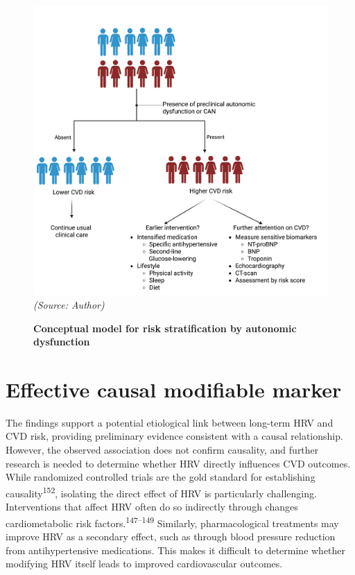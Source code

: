 \documentclass[
  a4paper,
  headsepline=true,
  open=left]{scrbook}
\begin{document}
\begin{figure}

{\centering 

\includegraphics{images/strafication_tree_of_CAN(1).png}\\
\emph{(Source: Author)}

}

\caption{\label{fig-rsp}\textbf{Conceptual model for risk stratification
by autonomic dysfunction}}

\end{figure}

\hypertarget{effective-causal-modifiable-marker}{%
\section{Effective causal modifiable
marker}\label{effective-causal-modifiable-marker}}

The findings support a potential etiological link between long-term HRV
and CVD risk, providing preliminary evidence consistent with a causal
relationship. However, the observed association does not confirm
causality, and further research is needed to determine whether HRV
directly influences CVD outcomes. While randomized controlled trials are
the gold standard for establishing causality\textsuperscript{152},
isolating the direct effect of HRV is particularly challenging.
Interventions that affect HRV often do so indirectly through changes
cardiometabolic risk factors.\textsuperscript{147--149} Similarly,
pharmacological treatments may improve HRV as a secondary effect, such
as through blood pressure reduction from antihypertensive medications.
This makes it difficult to determine whether modifying HRV itself leads
to improved cardiovascular outcomes.
\end{document}
